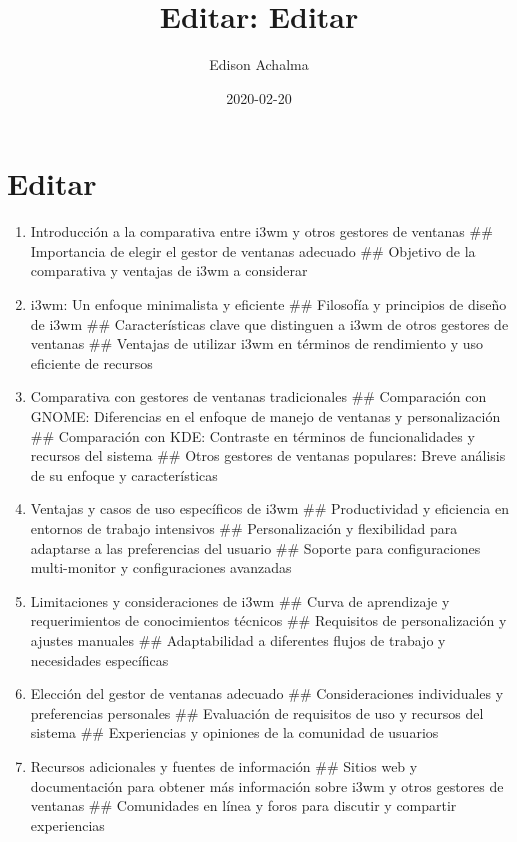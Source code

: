 \documentclass[
  jou,
  floatsintext,
  longtable,
  a4paper,
  nolmodern,
  notxfonts,
  notimes,
  colorlinks=true,linkcolor=blue,citecolor=blue,urlcolor=blue]{apa7}
\title{Editar: Editar}
\author{Edison Achalma}
\affiliation{
{Escuela Profesional de Economía, Universidad Nacional de San Cristóbal
de Huamanga}}
\date{2020-02-20}
\begin{document}
\maketitle

\hypertarget{toc}{}
\tableofcontents
\newpage
\section[Introduction]{Editar}

\setcounter{secnumdepth}{-\maxdimen} %

\setlength\LTleft{0pt}


\begin{enumerate}
\def\labelenumi{\arabic{enumi}.}
\item
  Introducción a la comparativa entre i3wm y otros gestores de ventanas
  \#\# Importancia de elegir el gestor de ventanas adecuado \#\#
  Objetivo de la comparativa y ventajas de i3wm a considerar
\item
  i3wm: Un enfoque minimalista y eficiente \#\# Filosofía y principios
  de diseño de i3wm \#\# Características clave que distinguen a i3wm de
  otros gestores de ventanas \#\# Ventajas de utilizar i3wm en términos
  de rendimiento y uso eficiente de recursos
\item
  Comparativa con gestores de ventanas tradicionales \#\# Comparación
  con GNOME: Diferencias en el enfoque de manejo de ventanas y
  personalización \#\# Comparación con KDE: Contraste en términos de
  funcionalidades y recursos del sistema \#\# Otros gestores de ventanas
  populares: Breve análisis de su enfoque y características
\item
  Ventajas y casos de uso específicos de i3wm \#\# Productividad y
  eficiencia en entornos de trabajo intensivos \#\# Personalización y
  flexibilidad para adaptarse a las preferencias del usuario \#\#
  Soporte para configuraciones multi-monitor y configuraciones avanzadas
\item
  Limitaciones y consideraciones de i3wm \#\# Curva de aprendizaje y
  requerimientos de conocimientos técnicos \#\# Requisitos de
  personalización y ajustes manuales \#\# Adaptabilidad a diferentes
  flujos de trabajo y necesidades específicas
\item
  Elección del gestor de ventanas adecuado \#\# Consideraciones
  individuales y preferencias personales \#\# Evaluación de requisitos
  de uso y recursos del sistema \#\# Experiencias y opiniones de la
  comunidad de usuarios
\item
  Recursos adicionales y fuentes de información \#\# Sitios web y
  documentación para obtener más información sobre i3wm y otros gestores
  de ventanas \#\# Comunidades en línea y foros para discutir y
  compartir experiencias
\end{enumerate}
\end{document}
